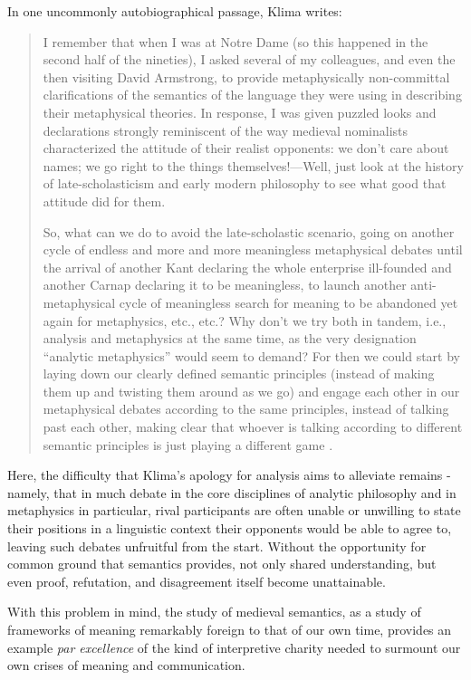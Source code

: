 \documentclass[]{article}
\begin{document}
In one uncommonly autobiographical passage, Klima writes: 
\begin{quote}
I remember that when I was at Notre Dame (so this happened in the second
half of the nineties), I asked several of my colleagues, and even the then
visiting David Armstrong, to provide metaphysically non-committal
clarifications of the semantics of the language they were using in
describing their metaphysical theories. In response, I was given puzzled
looks and declarations strongly reminiscent of the way medieval
nominalists characterized the attitude of their realist opponents: we don’t
care about names; we go right to the things themselves!—Well, just look 
at the history of late-scholasticism and early modern philosophy to see
what good that attitude did for them.

So, what can we do to avoid the late-scholastic scenario, going on another
cycle of endless and more and more meaningless metaphysical debates
until the arrival of another Kant declaring the whole enterprise ill-founded
and another Carnap declaring it to be meaningless, to launch another anti-metaphysical cycle of meaningless search for meaning to be abandoned
yet again for metaphysics, etc., etc.? Why don’t we try both in tandem,
i.e., analysis and metaphysics at the same time, as the very designation
“analytic metaphysics” would seem to demand? For then we could start by
laying down our clearly defined semantic principles (instead of making
them up and twisting them around as we go) and engage each other in our
metaphysical debates according to the same principles, instead of talking
past each other, making clear that whoever is talking according to different
semantic principles is just playing a different game \autocite[86-87]{Klima2014}.
\end{quote}

Here, the difficulty that Klima's apology for analysis aims to alleviate remains - 
namely, that in much debate in the core disciplines of analytic philosophy  
and in metaphysics in particular, 
rival participants are often unable or unwilling to state their positions in a linguistic context their opponents would be able to agree to, 
leaving such debates unfruitful from the start. 
Without the opportunity for common ground that semantics provides, 
not only shared understanding, 
but even proof, refutation, 
and disagreement itself become unattainable.

With this problem in mind, 
the study of medieval semantics, 
as a study of frameworks of meaning remarkably foreign to that of our own time, 
provides an example \emph{par excellence} of the kind of interpretive charity needed to surmount our own crises of meaning and communication. 

\printbibliography
\end{document}
